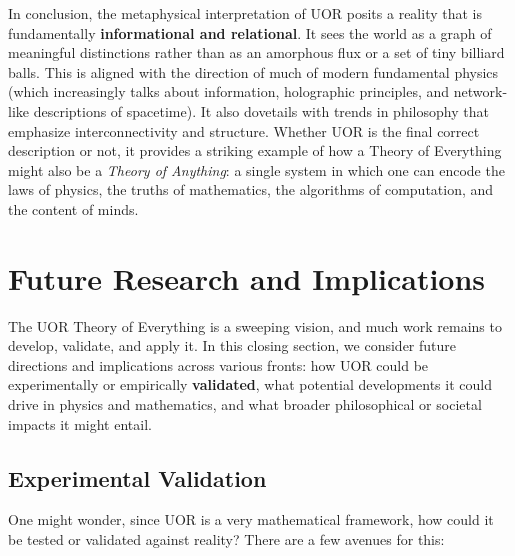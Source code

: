 \documentclass[12pt]{article}
\begin{document}
\medskip

In conclusion, the metaphysical interpretation of UOR posits a reality that is fundamentally \textbf{informational and relational}. It sees the world as a graph of meaningful distinctions rather than as an amorphous flux or a set of tiny billiard balls. This is aligned with the direction of much of modern fundamental physics (which increasingly talks about information, holographic principles, and network-like descriptions of spacetime). It also dovetails with trends in philosophy that emphasize interconnectivity and structure. Whether UOR is the final correct description or not, it provides a striking example of how a Theory of Everything might also be a \emph{Theory of Anything}: a single system in which one can encode the laws of physics, the truths of mathematics, the algorithms of computation, and the content of minds.

\section{Future Research and Implications}

The UOR Theory of Everything is a sweeping vision, and much work remains to develop, validate, and apply it. In this closing section, we consider future directions and implications across various fronts: how UOR could be experimentally or empirically \textbf{validated}, what potential developments it could drive in physics and mathematics, and what broader philosophical or societal impacts it might entail.

\subsection{Experimental Validation}

One might wonder, since UOR is a very mathematical framework, how could it be tested or validated against reality? There are a few avenues for this:

\medskip
\end{document}
